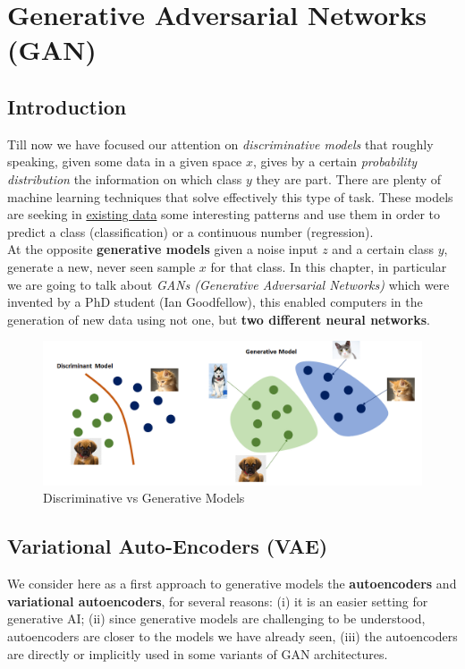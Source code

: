 \chapter{Generative Adversarial Networks (GAN)}

\section{Introduction}
Till now we have focused our attention on \textit{discriminative models} that roughly speaking, given some data in a given space $x$, gives by a certain \textit{probability distribution} the information on which class $y$ they are part. There are plenty of machine learning techniques that solve effectively this type of task. These models are seeking in \underline{existing data} some interesting patterns and use them in order to predict a class (classification) or a continuous number (regression).\\
At the opposite \textbf{generative models} given a noise input $z$ and a certain class $y$, generate a new, never seen sample $x$ for that class. In this chapter, in particular we are going to talk about \textit{GANs (Generative Adversarial Networks)} which were invented by a PhD student (Ian Goodfellow), this enabled computers in the generation of new data using not one, but \textbf{two different neural networks}. 

\begin{figure}[h]
    \centering
    \includegraphics[scale=0.3]{img/generative_1.png}
    \caption{Discriminative vs Generative Models}
\end{figure}

\section{Variational Auto-Encoders (VAE)}
We consider here as a first approach to generative models the \textbf{autoencoders} and \textbf{variational autoencoders}, for several reasons: (i) it is an easier setting for generative AI; (ii) since generative models are challenging to be understood, autoencoders are closer to the models we have already seen, (iii) the autoencoders are directly or implicitly used in some variants of GAN architectures.

